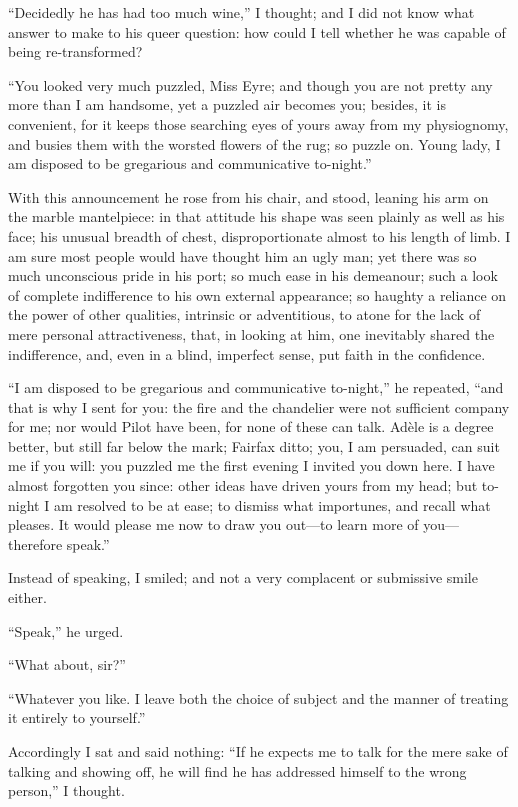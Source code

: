 \enquote{Decidedly he has had too much wine,} I thought; and I did not
know what answer to make to his queer question: how could I tell whether
he was capable of being re-transformed?

\enquote{You looked very much puzzled, Miss Eyre; and though you are not
pretty any more than I am handsome, yet a puzzled air becomes you;
besides, it is convenient, for it keeps those searching eyes of yours
away from my physiognomy, and busies them with the worsted flowers of
the rug; so puzzle on. Young lady, I am disposed to be gregarious and
communicative to-night.}

With this announcement he rose from his chair, and stood, leaning his
arm on the marble mantelpiece: in that attitude his shape was seen
plainly as well as his face; his unusual breadth of chest,
disproportionate almost to his length of limb. I am sure most people
would have thought him an ugly man; yet there was so much unconscious
pride in his port; so much ease in his demeanour; such a look of
complete indifference to his own external appearance; so haughty a
reliance on the power of other qualities, intrinsic or adventitious, to
atone for the lack of mere personal attractiveness, that, in looking at
him, one inevitably shared the indifference, and, even in a blind,
imperfect sense, put faith in the confidence.

\enquote{I am disposed to be gregarious and communicative to-night,} he
repeated, \enquote{and that is why I sent for you: the fire and the
chandelier were not sufficient company for me; nor would Pilot have
been, for none of these can talk. Adèle is a degree better, but still
far below the mark; \Mrs{} Fairfax ditto; you, I am persuaded, can suit me
if you will: you puzzled me the first evening I invited you down here. 
I have almost forgotten you since: other ideas have driven yours from my
head; but to-night I am resolved to be at ease; to dismiss what
importunes, and recall what pleases. It would please me now to draw you
out---to learn more of you---therefore speak.}

Instead of speaking, I smiled; and not a very complacent or submissive
smile either.

\enquote{Speak,} he urged.

\enquote{What about, sir?}

\enquote{Whatever you like. I leave both the choice of subject and the
manner of treating it entirely to yourself.}

Accordingly I sat and said nothing: \enquote{If he expects me to talk
for the mere sake of talking and showing off, he will find he has
addressed himself to the wrong person,} I thought.

